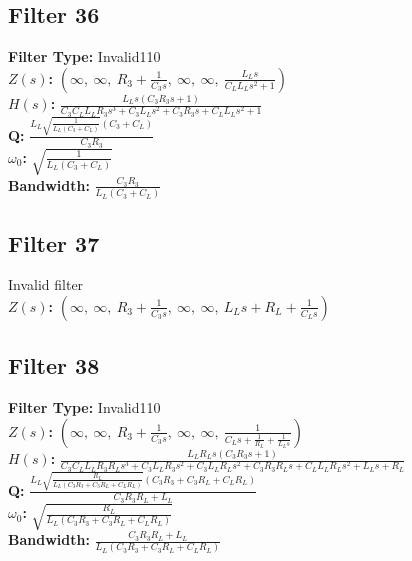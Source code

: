 \documentclass{article}
\begin{document}
\subsection*{Filter 36}
\textbf{Filter Type:} Invalid110 \\ 
\textbf{$Z(s)$:} $\left( \infty, \  \infty, \  R_{3} + \frac{1}{C_{3} s}, \  \infty, \  \infty, \  \frac{L_{L} s}{C_{L} L_{L} s^{2} + 1}\right)$ \\ 
\textbf{$H(s)$:} $\frac{L_{L} s \left(C_{3} R_{3} s + 1\right)}{C_{3} C_{L} L_{L} R_{3} s^{3} + C_{3} L_{L} s^{2} + C_{3} R_{3} s + C_{L} L_{L} s^{2} + 1}$ \\ 
\textbf{Q:} $\frac{L_{L} \sqrt{\frac{1}{L_{L} \left(C_{3} + C_{L}\right)}} \left(C_{3} + C_{L}\right)}{C_{3} R_{3}}$ \\ 
\textbf{$\omega_0$:} $\sqrt{\frac{1}{L_{L} \left(C_{3} + C_{L}\right)}}$ \\ 
\textbf{Bandwidth:} $\frac{C_{3} R_{3}}{L_{L} \left(C_{3} + C_{L}\right)}$ \\ 
\subsection*{Filter 37}
Invalid filter \\ 
\textbf{$Z(s)$:} $\left( \infty, \  \infty, \  R_{3} + \frac{1}{C_{3} s}, \  \infty, \  \infty, \  L_{L} s + R_{L} + \frac{1}{C_{L} s}\right)$ \\ 
\subsection*{Filter 38}
\textbf{Filter Type:} Invalid110 \\ 
\textbf{$Z(s)$:} $\left( \infty, \  \infty, \  R_{3} + \frac{1}{C_{3} s}, \  \infty, \  \infty, \  \frac{1}{C_{L} s + \frac{1}{R_{L}} + \frac{1}{L_{L} s}}\right)$ \\ 
\textbf{$H(s)$:} $\frac{L_{L} R_{L} s \left(C_{3} R_{3} s + 1\right)}{C_{3} C_{L} L_{L} R_{3} R_{L} s^{3} + C_{3} L_{L} R_{3} s^{2} + C_{3} L_{L} R_{L} s^{2} + C_{3} R_{3} R_{L} s + C_{L} L_{L} R_{L} s^{2} + L_{L} s + R_{L}}$ \\ 
\textbf{Q:} $\frac{L_{L} \sqrt{\frac{R_{L}}{L_{L} \left(C_{3} R_{3} + C_{3} R_{L} + C_{L} R_{L}\right)}} \left(C_{3} R_{3} + C_{3} R_{L} + C_{L} R_{L}\right)}{C_{3} R_{3} R_{L} + L_{L}}$ \\ 
\textbf{$\omega_0$:} $\sqrt{\frac{R_{L}}{L_{L} \left(C_{3} R_{3} + C_{3} R_{L} + C_{L} R_{L}\right)}}$ \\ 
\textbf{Bandwidth:} $\frac{C_{3} R_{3} R_{L} + L_{L}}{L_{L} \left(C_{3} R_{3} + C_{3} R_{L} + C_{L} R_{L}\right)}$ \\ 
\end{document}
